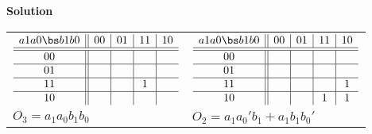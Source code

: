 \begin{enumerate}
\begin{itemize}
                \begin{onlysolution}  \textbf{Solution} \itshape{
                        \begin{tabular}{ll}
                            $
                            \begin{array} {c||c|c|c|c}
                                a1 a0 \bs b1 b0 & 00 & 01 & 11 & 10 \\ \hline \hline
                                00        &    &    &    &    \\ \hline
                                01        &    &    &    &    \\ \hline
                                11        &    &    & 1  &    \\ \hline
                                10        &    &    &    &    \\
                            \end{array}$ &
                            $
                            \begin{array} {c||c|c|c|c}
                                a1 a0 \bs b1 b0 & 00 & 01 & 11 & 10 \\ \hline \hline
                                00        &    &    &    &    \\ \hline
                                01        &    &    &    &    \\ \hline
                                11        &    &    &    & 1  \\ \hline
                                10        &    &    & 1  & 1  \\
                            \end{array} $ \\
                            $O_3 = a_1a_0b_1b_0$ & $O_2 = a_1a_0'b_1 + a_1b_1b_0'$\\
                        \end{tabular}
                    }
                \end{onlysolution}


\end{itemize}
\end{enumerate}
